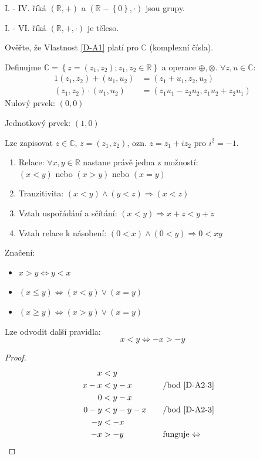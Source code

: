 I. - IV. říká $(\mathbb{R}, +)$ a $(\mathbb{R} - \left\{0\right\}, \cdot)$ jsou grupy.

I. - VI. říká $(\mathbb{R}, +, \cdot)$ je těleso.

Ověřte, že Vlastnost \ref{D-A1} platí pro $\mathbb{C}$ (komplexní čísla).

\begin{example}
	Definujme $\mathbb{C} = \left\{z = (z_1, z_2); z_1, z_2 \in \mathbb{R}\right\}$ a
	operace $\oplus, \otimes$. $\forall z, u \in \mathbb{C}:$
	\begin{alignat}{1}
		(z_1, z_2) + (u_1, u_2) &= (z_1 + u_1, z_2, u_2) \\
		(z_1, z_2) \cdot (u_1, u_2) &= (z_1u_1 - z_2u_2, z_1u_2 + z_2u_1)
	\end{alignat}
	Nulový prvek: $(0, 0)$
	
	Jednotkový prvek: $(1, 0)$

	Lze zapisovat $z\in \mathbb{C}$, $z = (z_1, z_2)$, ozn. $z = z_1 + iz_2$ pro $i^2 = -1$.
\end{example}
\begin{definitionAi}[Uspořádání]
	\begin{enumerate}[I]
		\item Relace: $\forall x, y \in \mathbb{R}$ nastane právě jedna z možností: \\
		$(x<y)$ nebo $(x>y)$ nebo $(x=y)$
		\item Tranzitivita: $(x<y) \land (y<z) \Rightarrow (x<z)$
		\item\label{D-A2-3} Vztah uspořádání a sčítání: $(x<y) \Rightarrow x+z < y+z$
		\item\label{D-A2-4} Vztah relace k násobení: $(0<x) \land (0<y) \Rightarrow 0 < xy$
	\end{enumerate}
\end{definitionAi}

Značení:
\begin{itemize}
	\item $x>y \Leftrightarrow y<x$
	\item $(x\leq y) \Leftrightarrow (x<y) \lor (x=y)$
	\item $(x\geq y) \Leftrightarrow (x>y) \lor (x=y)$
\end{itemize}

Lze odvodit další pravidla:
\begin{equation}\label{RelationsOfNegatives}
	x<y \Leftrightarrow -x > -y
\end{equation}
\begin{proof}
	\begin{alignat*}{2}
		x&<y \\
		x-x&<y-x &&\text{\quad /bod \ref{D-A2-3}} \\
		0&<y-x \\
		0-y&<y-y-x &&\text{\quad /bod \ref{D-A2-3}} \\
		-y&<-x \\
		-x&>-y &&\text{\quad funguje $\Leftrightarrow$} \\
	\end{alignat*}
\end{proof}

